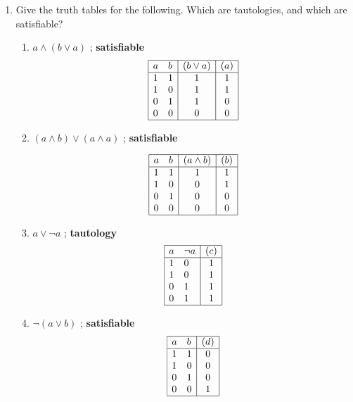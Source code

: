 \documentclass[basic, header]{nosvagor-notes}
\begin{document}
\begin{enumerate}[itemsep=2em]
  \item Give the truth tables for the following. Which are tautologies, and which
  are satisfiable?
  \begin{multicols}{2}
  \begin{enumerate}
    \item \(a \land (b \lor a)\) ; \textbf{satisfiable}
      \[%
        \begin{array}{|ll|c|c|}
          \hline
          a & b & (b \lor a)  & (a)\\
          \hline
          1 & 1 & 1 & 1 \\
          1 & 0 & 1 & 1 \\
          0 & 1 & 1 & 0 \\
          0 & 0 & 0 & 0 \\
          \hline
        \end{array}
      \]%


    \item \((a \land b) \lor (a \land a) \) ; \textbf{satisfiable}

      \[%
        \begin{array}{|ll|c|c|}
          \hline
          a & b & (a \land b) & (b) \\
          \hline
          1 & 1 & 1 & 1 \\
          1 & 0 & 0 & 1 \\
          0 & 1 & 0 & 0 \\
          0 & 0 & 0 & 0 \\
          \hline
        \end{array}
      \]%

    \item \(a \lor \lnot a\) ; \textbf{tautology}
      \[%
        \begin{array}{|ll|c|}
          \hline
            a & \lnot a & (c) \\
          \hline
            1 & 0 & 1 \\
            1 & 0 & 1 \\
            0 & 1 & 1 \\
            0 & 1 & 1 \\
          \hline
        \end{array}
      \]%

    \item \(\lnot (a \lor b)\) ; \textbf{satisfiable}
      \[%
        \begin{array}{|ll|c|}
          \hline
            a & b & (d) \\
          \hline
            1 & 1 & 0 \\
            1 & 0 & 0 \\
            0 & 1 & 0 \\
            0 & 0 & 1 \\
          \hline
        \end{array}
      \]%


\end{enumerate}
\end{multicols}
\end{enumerate}
\end{document}
